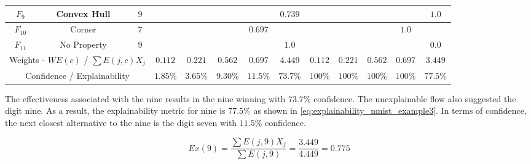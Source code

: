 \begin{table}[H]
\begin{center}
{\begin{tabular}{| c | c | c | c | c | c | c | c || c | c | c | c | c |}
        \hline
        $F_9$& Convex Hull & $9$ &  &  &  &  & $0.739$ &  &  &  &  & $1.0$ \\
        \hline
        $F_{10}$& Corner & $7$ &  &  &  & $0.697$ &  &  &  &  & $1.0$ &  \\
        \hline
        $F_{11}$& No Property & $9$ &  &  &  &  & $1.0$ & & & & & $0.0$ \\
        \hline
        \hline
        \multicolumn{3}{|c|}{Weights - $WE(c)$ / $\sum E(j,c)X_j$} & $0.112$ & $0.221$ & $0.562$ & $0.697$ & $4.449$ & $0.112$ & $0.221$ & $0.562$ & $0.697$ & $3.449$ \\
        \cline{0-12}
        \multicolumn{3}{|c|}{Confidence / Explainability} & $1.85\%$ & $3.65\%$ & $9.30\%$ & $11.5\%$ & $73.7\%$ & $100\%$ & $100\%$ & $100\%$ & $100\%$ & $77.5\%$ \\
        \cline{0-12}
        \end{tabular}
        }
        \end{center}
\end{table}

The effectiveness associated with the nine results in the nine winning with
$73.7\%$ confidence.  The unexplainable flow also suggested the digit nine. As a
result, the explainability metric for nine is $77.5\%$ as shown in
\eqref{eq:explainability_mnist_example3}.  In terms of confidence, the next
closest alternative to the nine is the digit seven with $11.5\%$ confidence.

\begin{equation}\label{eq:explainability_mnist_example3}
    Ex(9)=\frac{\sum{E(j,9)X_j}}{\sum{E(j,9)}} = \frac{3.449}{4.449}=0.775
\end{equation}



